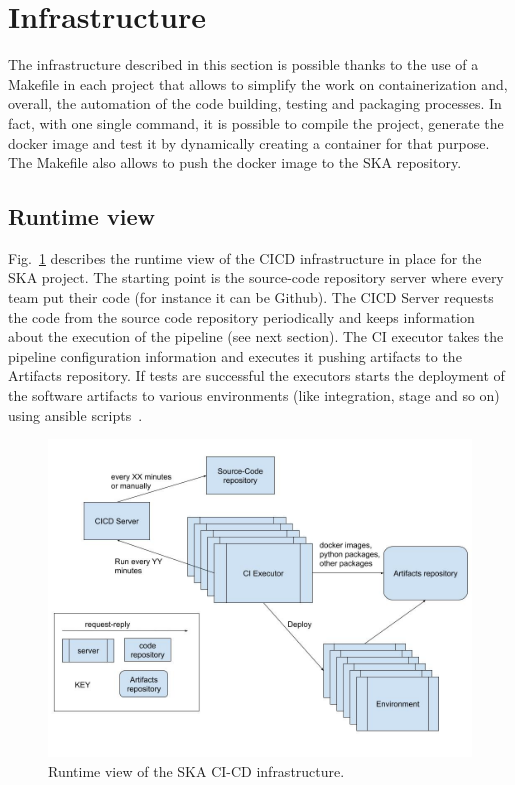 \documentclass[a4paper,
               keeplastbox,   %
               ]{jacow}
\begin{document}
\section{Infrastructure}
The infrastructure described in this section is possible thanks to the use of a Makefile in each project that allows to simplify the work on containerization and, overall, the automation of the code building, testing and packaging processes. In fact, with one single command, it is possible to compile the project, generate the docker image and test it by dynamically creating a container for that purpose.  The Makefile also allows to push the docker image to the SKA repository. 
\subsection{Runtime view}
Fig.~\ref{fig:cicdInfra} describes the runtime view of the CICD infrastructure in place for the SKA project. The starting point is the source-code repository server where every team put their code (for instance it can be Github). The CICD Server requests the code from the source code repository periodically and keeps information about the execution of the pipeline (see next section).  The CI executor takes the pipeline configuration information and executes it pushing artifacts to the Artifacts repository. If tests are successful the executors starts the deployment of the software artifacts to various environments (like integration, stage and so on) using ansible scripts~\cite{ansible}.
\begin{figure}[!htb]
   \centering
   \includegraphics*[width=1\columnwidth]{cicdInfra}
   \caption{Runtime view of the SKA CI-CD infrastructure.}
   \label{fig:cicdInfra}
\end{figure}
\end{document}
